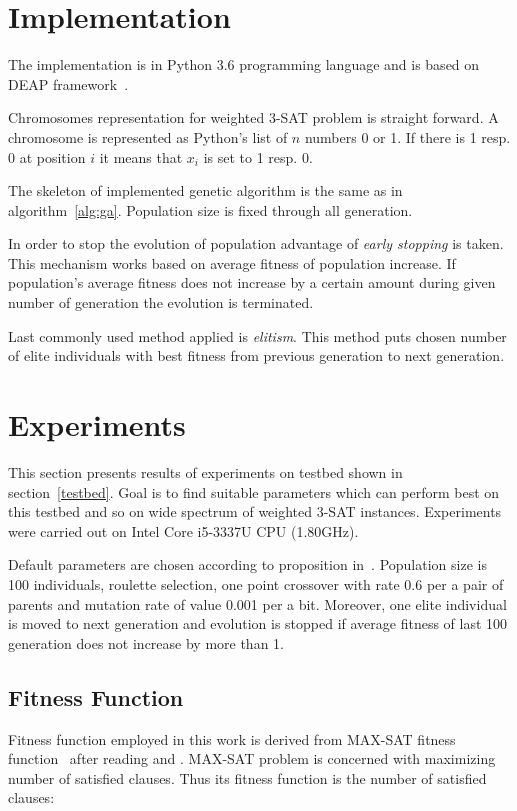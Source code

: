 \documentclass{article}
\begin{document}
\section{Implementation}

The implementation is in Python 3.6 programming language
and is based on DEAP framework~\cite{fortin2012}.

Chromosomes representation for weighted 3-SAT problem is straight forward.
A chromosome is represented as Python's list of $n$ numbers 0 or 1.
If there is 1 resp. 0 at position $i$ it means that $x_i$ is set to 1 resp. 0.

The skeleton of implemented genetic algorithm is the same as
in algorithm~\ref{alg:ga}.
Population size is fixed through all generation.

In order to stop the evolution of population advantage of
\textit{early stopping} is taken.
This mechanism works based on average fitness of population increase.
If population's average fitness does not increase by a certain amount
during given number of generation the evolution is terminated.

Last commonly used method applied is \textit{elitism}.
This method puts chosen number of elite individuals with best fitness
from previous generation to next generation.

\section{Experiments}

This section presents results of experiments on testbed
shown in section~\ref{testbed}.
Goal is to find suitable parameters
which can perform best on this testbed
and so on wide spectrum of weighted 3-SAT instances.
Experiments were carried out on Intel Core i5-3337U CPU (1.80GHz).

Default parameters are chosen according to proposition in~\cite{dejong1975}.
Population size is 100 individuals, roulette selection,
one point crossover with rate 0.6 per a pair of parents
and mutation rate of value 0.001 per a bit.
Moreover, one elite individual is moved to next generation
and evolution is stopped
if average fitness of last 100 generation does not increase by more than 1.

\subsection{Fitness Function}

Fitness function employed in this work is derived from MAX-SAT fitness
function~\cite{dejong1989} after reading \cite{gottlieb2002}
and \cite{ellerweg2004}.
MAX-SAT problem is concerned with maximizing number of satisfied clauses.
Thus its fitness function is the number of satisfied clauses:
\end{document}
